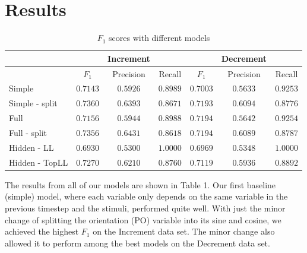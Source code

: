 \documentclass{article} %
\begin{document}
\section{Results}
\begin{table}[t]
\caption{$F_1$ scores with different models}
\begin{center}
\begin{tabular}{l|ccc|ccc}
 & & Increment & & & Decrement & \\ \hline
  & $F_1$ & Precision & Recall & $F_1$ & Precision & Recall \\ \hline
 Simple & $0.7143$ & $0.5926$ & $0.8989$ & $0.7003$ & $0.5633$ & $0.9253$ \\
 Simple - split & $0.7360$ & $0.6393$ & $0.8671$ & $ 0.7193$ & $0.6094$ & $0.8776$ \\
 Full & $0.7156$ & $0.5944$ & $0.8988$ & $0.7194$ & $0.5642$ & $0.9254$ \\
 Full - split & $0.7356$ & $0.6431$ & $0.8618$ & $0.7194$ & $0.6089$ & $0.8787$ \\
 Hidden - LL & $0.6930$ & $0.5300$ & $1.0000$ & $0.6969$ & $0.5348$ & $1.0000$ \\
 Hidden - TopLL & $0.7270$ & $0.6210$ & $0.8760$ & $0.7119$ & $0.5936$ & $0.8892$
\end{tabular}
\end{center}
\end{table}
The results from all of our models are shown in Table 1. Our first baseline (simple) model, where each variable only depends on the same variable in the previous timestep and the stimuli, performed quite well. With just the minor change of splitting the orientation (PO) variable into its sine and cosine, we achieved the highest $F_1$ on the Increment data set. The minor change also allowed it to perform among the best models on the Decrement data set. 
\end{document}
